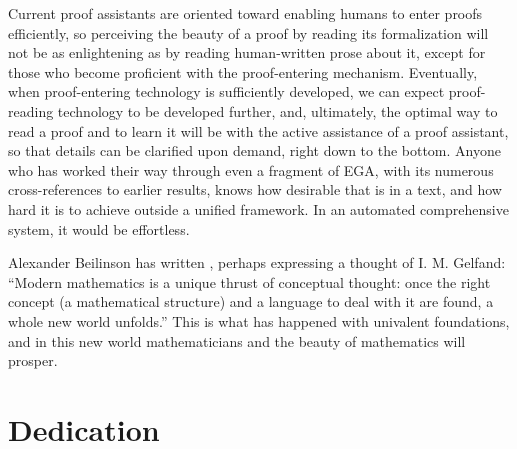 \documentclass[letter,12pt]{amsart}
\theoremstyle{definition}
\theoremstyle{remark}
\numberwithin{equation}{section}
\begin{document}
Current proof assistants are oriented toward enabling humans to enter proofs efficiently, so perceiving the beauty of a proof by reading its
formalization will not be as enlightening as by reading human-written prose about it, except for those who become proficient with the
proof-entering mechanism.  Eventually, when proof-entering technology is sufficiently developed, we can expect proof-reading technology to be
developed further, and, ultimately, the optimal way to read a proof and to learn it will be with the active assistance of a proof assistant, so
that details can be clarified upon demand, right down to the bottom.  Anyone who has worked their way through even a fragment of EGA, with its
numerous cross-references to earlier results, knows how desirable that is in a text, and how hard it is to achieve outside a unified framework.
In an automated comprehensive system, it would be effortless.

Alexander Beilinson has written \cite{IMGelfand}, perhaps expressing a thought of I.{} M.{} Gelfand: ``Modern mathematics is a unique thrust of
conceptual thought: once the right concept (a mathematical structure) and a language to deal with it are found, a whole new world unfolds.''
This is what has happened with univalent foundations, and in this new world mathematicians and the beauty of mathematics will prosper.

\section*{Dedication}
\end{document}
